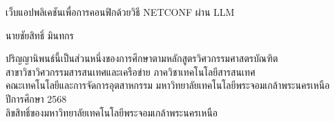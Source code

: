 \newpage
\newpage
\thispagestyle{empty}
\begin{center}

\vspace*{-0.5in}

เว็บแอปพลิเคชันเพื่อการคอนฟิกด้วยวิธี NETCONF ผ่าน LLM      %

\vspace{0.1in}

\vspace{90mm}
 นายชัยสิทธิ์ มินทกร %
\vspace{94mm}   




\vspace{0.1in}



ปริญญานิพนธ์นี้เป็นส่วนหนึ่งของการศึกษาตามหลักสูตรวิศวกรรมศาสตรบัณฑิต\\
สาขาวิชาวิศวกรรมสารสนเทศและเครือข่าย ภาควิชาเทคโนโลยีสารสนเทศ\\

คณะเทคโนโลยีและการจัดการอุตสาหกรรม มหาวิทยาลัยเทคโนโลยีพระจอมเกล้าพระนครเหนือ\\
ปีการศึกษา 2568\\
ลิขสิทธิ์ของมหาวิทยาลัยเทคโนโลยีพระจอมเกล้าพระนครเหนือ

\end{center}


